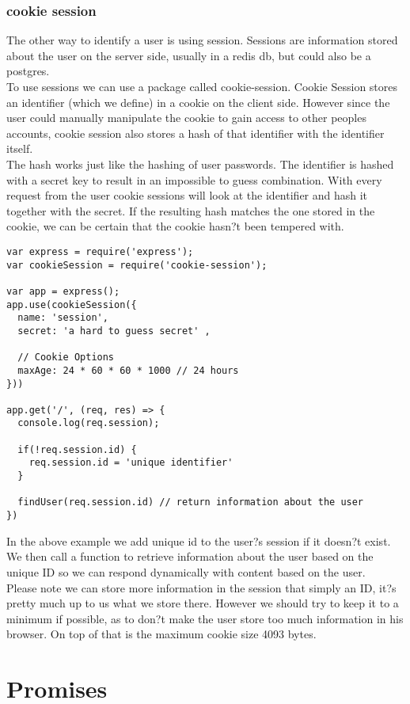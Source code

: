 \documentclass[a4paper]{article}
\begin{document}
\subsubsection{cookie session}
The other way to identify a user is using session. Sessions are information stored about the user on the server side, usually in a redis db, but could also be a postgres.
\\
To use sessions we can use a package called cookie-session. Cookie Session stores an identifier (which we define) in a cookie on the client side. However since the user could manually manipulate the cookie to gain access to other peoples accounts, cookie session also stores a hash of that identifier with the identifier itself.
\\
The hash works just like the hashing of user passwords. The identifier is hashed with a secret key to result in an impossible to guess combination. With every request from the user cookie sessions will look at the identifier and hash it together with the secret. If the resulting hash matches the one stored in the cookie, we can be certain that the cookie hasn?t been tempered with.
\begin{lstlisting}
var express = require('express');
var cookieSession = require('cookie-session');

var app = express();
app.use(cookieSession({
  name: 'session',
  secret: 'a hard to guess secret' ,

  // Cookie Options
  maxAge: 24 * 60 * 60 * 1000 // 24 hours
}))

app.get('/', (req, res) => {
  console.log(req.session);

  if(!req.session.id) {
    req.session.id = 'unique identifier'
  }

  findUser(req.session.id) // return information about the user
})
\end{lstlisting}

In the above example we add unique id to the user?s session if it doesn?t exist. We then call a function to retrieve information about the user based on the unique ID so we can respond dynamically with content based on the user.
\\
Please note we can store more information in the session that simply an ID, it?s pretty much up to us what we store there. However we should try to keep it to a minimum if possible, as to don?t make the user store too much information in his browser. On top of that is the maximum cookie size 4093 bytes.
\section{Promises}
\end{document}
